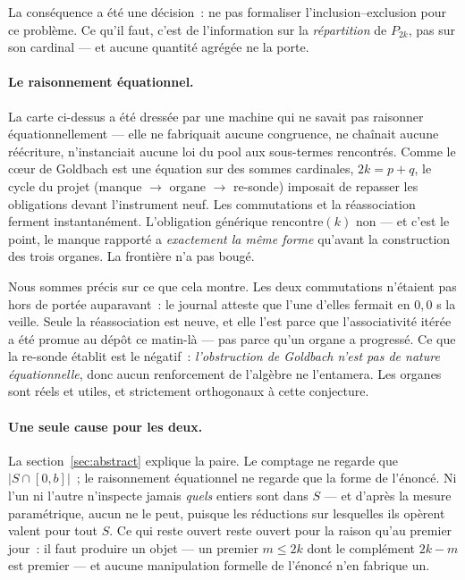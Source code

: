 \documentclass[11pt]{article}
\theoremstyle{remark}\newtheorem{remarque}{Remarque}
\begin{document}
La conséquence a été une décision~: ne pas formaliser l'inclusion--exclusion pour ce
problème. Ce qu'il faut, c'est de l'information sur la \emph{répartition} de $P_{2k}$,
pas sur son cardinal --- et aucune quantité agrégée ne la porte.

\paragraph{Le raisonnement équationnel.} La carte ci-dessus a été dressée par une machine
qui ne savait pas raisonner équationnellement --- elle ne fabriquait aucune congruence, ne
chaînait aucune réécriture, n'instanciait aucune loi du pool aux sous-termes rencontrés.
Comme le cœur de Goldbach est une équation sur des sommes cardinales, $2k = p+q$, le
cycle du projet (manque $\rightarrow$ organe $\rightarrow$ re-sonde) imposait de repasser
les obligations devant l'instrument neuf. Les commutations et la réassociation ferment
instantanément. L'obligation générique $\mathrm{rencontre}(k)$ non --- et c'est le point,
le manque rapporté a \emph{exactement la même forme} qu'avant la construction des trois
organes. La frontière n'a pas bougé.

Nous sommes précis sur ce que cela montre. Les deux commutations n'étaient pas hors de
portée auparavant~: le journal atteste que l'une d'elles fermait en $0{,}0$ s la veille.
Seule la réassociation est neuve, et elle l'est parce que l'associativité itérée a été
promue au dépôt ce matin-là --- pas parce qu'un organe a progressé. Ce que la re-sonde
établit est le négatif~: \emph{l'obstruction de Goldbach n'est pas de nature
équationnelle}, donc aucun renforcement de l'algèbre ne l'entamera. Les organes sont
réels et utiles, et strictement orthogonaux à cette conjecture.

\paragraph{Une seule cause pour les deux.} La section~\ref{sec:abstract} explique la
paire. Le comptage ne regarde que $|S \cap [0,b]|$~; le raisonnement équationnel ne
regarde que la forme de l'énoncé. Ni l'un ni l'autre n'inspecte jamais \emph{quels}
entiers sont dans $S$ --- et d'après la mesure paramétrique, aucun ne le peut, puisque les
réductions sur lesquelles ils opèrent valent pour tout $S$. Ce qui reste ouvert reste
ouvert pour la raison qu'au premier jour~: il faut produire un objet --- un premier
$m \le 2k$ dont le complément $2k-m$ est premier --- et aucune manipulation formelle de
l'énoncé n'en fabrique un.
\end{document}
